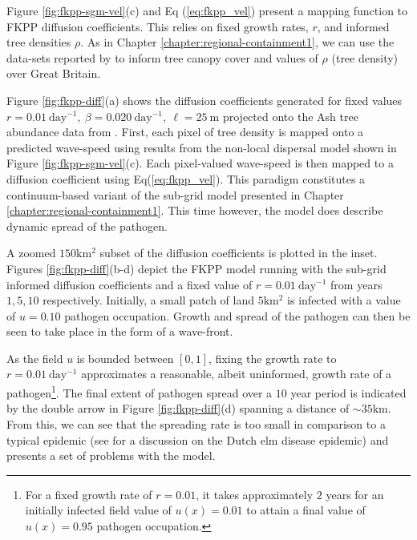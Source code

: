 Figure \ref{fig:fkpp-sgm-vel}(c) and Eq (\ref{eq:fkpp_vel}) present a mapping function to FKPP diffusion coefficients. %
This relies on fixed growth rates, $r$, and informed tree densities $\rho$. %
As in Chapter \ref{chapter:regional-containment1}, we can use the data-sets reported by \cite{hill.data} to inform tree canopy cover and values of $\rho$ (tree density) over Great Britain. %

Figure \ref{fig:fkpp-diff}(a) shows the diffusion coefficients generated for fixed values $r=0.01\ \mathrm{day^{-1}},\ \beta=0.020\ \mathrm{day^{-1}},\ \ell=25\ \mathrm{m}$ projected onto the Ash tree abundance data from \cite{hill.data}. %
First, each pixel of tree density is mapped onto a predicted wave-speed using results from the non-local dispersal model shown in Figure \ref{fig:fkpp-sgm-vel}(c). %
Each pixel-valued wave-speed is then mapped to a diffusion coefficient using Eq(\ref{eq:fkpp_vel}). %
This paradigm constitutes a continuum-based variant of the sub-grid model presented in Chapter \ref{chapter:regional-containment1}. %
This time however, the model does describe dynamic spread of the pathogen. 

A zoomed $150\mathrm{km^2}$ subset of the diffusion coefficients is plotted in the inset. %
Figures \ref{fig:fkpp-diff}(b-d) depict the FKPP model running with the sub-grid informed diffusion coefficients and a fixed value of $r=0.01\ \mathrm{day^{-1}}$ from years $1, 5, 10$ respectively. %
Initially, a small patch of land $5\mathrm{km^2}$ is infected with a value of $u=0.10$ pathogen occupation. Growth and spread of the pathogen can then be seen to take place in the form of a wave-front.  %

As the field $u$ is bounded between $[0, 1]$, fixing the growth rate to $r=0.01\ \mathrm{day^{-1}}$ approximates a reasonable, %
albeit uninformed, growth rate of a pathogen\footnote{For a fixed growth rate of $r=0.01$, it takes approximately $2$ years for an initially infected field value of $u(x)=0.01$ to attain a final value of $u(x)=0.95$ pathogen occupation.}. %
The final extent of pathogen spread over a $10$ year period is indicated by the double arrow in Figure \ref{fig:fkpp-diff}(d) spanning a distance of $\sim 35\mathrm{km}$. %
From this, we can see that the spreading rate is too small in comparison to a typical epidemic (see \cite{dutch-elm-mismanage} for a discussion on the Dutch elm disease epidemic) and presents a set of problems with the model. %

